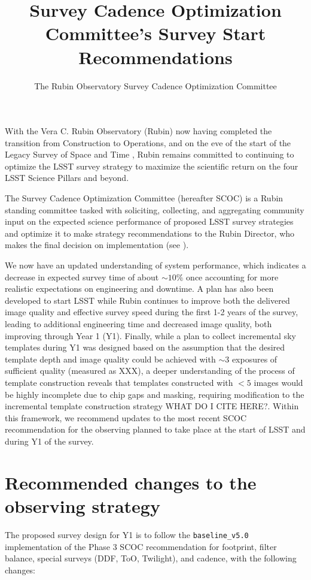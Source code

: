 \documentclass[SE,lsstdraft,authoryear,toc]{lsstdoc}
\title{Survey Cadence Optimization Committee’s Survey Start Recommendations}
\author{%
The Rubin Observatory Survey Cadence Optimization Committee
}
\date{\vcsDate}
\newcommand{\todo}[1]{{\color{red} #1}}
\begin{document}
\maketitle

With the Vera C. Rubin Observatory (Rubin) now having completed the transition from Construction to Operations, and on the eve of the start of the Legacy Survey of Space and Time \citep[LSST][]{LPM-17},  Rubin remains committed to continuing to optimize the LSST survey strategy to maximize the scientific return on the four LSST Science Pillars and beyond. 

The Survey Cadence Optimization Committee (hereafter SCOC) is a Rubin standing committee tasked with soliciting, collecting, and aggregating community input on the expected science performance of proposed LSST survey strategies and optimize it to make strategy recommendations to the Rubin Director, who makes the final decision on implementation (see \citep{Bianco_2022}). 

We now have an updated understanding of system performance, which indicates a decrease in expected survey time of about $\sim10\%$ once accounting for more realistic expectations on engineering and downtime. A plan has also been developed to start LSST while Rubin continues to improve both the delivered image quality and effective survey speed during the first 1-2 years of the survey, leading to additional engineering time and decreased image quality, both improving through Year 1 (Y1). Finally, while a plan to collect incremental sky templates during Y1 was designed based on the assumption that the desired template depth and image quality could be achieved with $\sim3$ exposures of sufficient quality (measured as \todo{XXX}), a deeper understanding of the process of template construction reveals that templates constructed with $<5$ images would be highly incomplete due to chip gaps and masking, requiring modification to the incremental template construction strategy \todo{WHAT DO I CITE HERE?}. Within this framework, we recommend updates to the most recent SCOC recommendation \citep{PSTN-056}  for the observing planned to take place at the start of LSST and during Y1 of the survey.

\section{Recommended changes to the observing strategy}\label{sec:recommendation}
The proposed survey design for Y1 is to follow the \texttt{baseline\_v5.0} implementation of the Phase 3 SCOC recommendation for footprint, filter balance, special surveys (DDF, ToO, Twilight), and cadence,  with the following changes:
\end{document}
